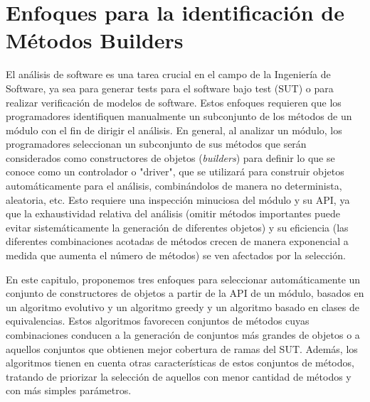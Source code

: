 \chapter[Identificación de métodos builders]{Enfoques para la identificación de Métodos Builders}
\label{cap:builders}

El análisis de software es una tarea crucial en el campo de la Ingeniería de Software, ya sea para generar tests para el software bajo test (SUT)  o para realizar verificación de modelos de software. Estos enfoques requieren que los programadores identifiquen manualmente un subconjunto de los métodos de un módulo con el fin de dirigir el análisis. En general, al analizar un módulo, los programadores seleccionan un subconjunto de sus métodos que serán considerados como constructores de objetos (\emph{builders}) para definir lo que se conoce como un controlador o "driver", que se utilizará para construir objetos automáticamente para el análisis, combinándolos de manera no determinista, aleatoria, etc. Esto requiere una inspección minuciosa del módulo y su API, ya que la exhaustividad relativa del análisis (omitir métodos importantes puede evitar sistemáticamente la generación de diferentes objetos) y su eficiencia (las diferentes combinaciones acotadas de métodos crecen de manera exponencial a medida que aumenta el número de métodos) se ven afectados por la selección.

En este capitulo, proponemos tres enfoques para seleccionar automáticamente un conjunto de constructores de objetos a partir de la API de un módulo, basados en un algoritmo evolutivo y un algoritmo greedy y un algoritmo basado en clases de equivalencias. Estos algoritmos favorecen conjuntos de métodos cuyas combinaciones conducen a la generación de conjuntos más grandes de objetos o a aquellos conjuntos que obtienen mejor cobertura de ramas del SUT. Además, los algoritmos tienen en cuenta otras características de estos conjuntos de métodos, tratando de priorizar la selección de aquellos con menor cantidad de métodos y con más simples parámetros.


